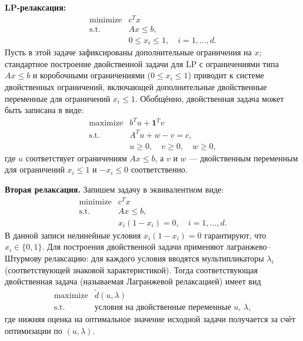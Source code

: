 \documentclass[a4paper,12pt]{article}
\begin{document}
	\textbf{LP-релаксация:}
	\[
	\begin{array}{rl}
		\text{minimize} & c^T x\\[1mm]
		\text{s.t.} & Ax \le b,\\[1mm]
		& 0 \le x_i \le 1,\quad i=1,\dots,d.
	\end{array}
	\]
	Пусть в этой задаче зафиксированы дополнительные ограничения на $x$; стандартное построение двойственной задачи для LP с ограничениями типа $Ax\le b$ и коробочными ограничениями ($0\le x_i\le 1$) приводит к системе двойственных ограничений, включающей дополнительные двойственные переменные для ограничений $x_i\le1$. Обобщённо, двойственная задача может быть записана в виде:
	\[
	\begin{array}{rl}
		\text{maximize} & b^T u + \mathbf{1}^T v\\[1mm]
		\text{s.t.} & A^T u + w - v = c,\\[1mm]
		& u\ge 0,\quad v\ge 0,\quad w\ge 0,
	\end{array}
	\]
	где $u$ соответствует ограничениям $Ax\le b$, а $v$ и $w$ --- двойственным переменным для ограничений $x_i\le 1$ и $-x_i\le 0$ соответственно.
	
	\medskip
	
	\textbf{Вторая релаксация.}  
	Запишем задачу в эквивалентном виде:
	\[
	\begin{array}{rl}
		\text{minimize} & c^T x\\[1mm]
		\text{s.t.} & Ax \le b,\\[1mm]
		& x_i(1-x_i)=0,\quad i=1,\dots,d.
	\end{array}
	\]
	В данной записи нелинейные условия $x_i(1-x_i)=0$ гарантируют, что $x_i\in\{0,1\}$. Для построения двойственной задачи применяют лагранжево–Штурмову релаксацию: для каждого условия вводятся мультипликаторы $\lambda_i$ (соответствующей знаковой характеристикой). Тогда соответствующая двойственная задача (называемая Лагранжевой релаксацией) имеет вид
	\[
	\begin{array}{rl}
		\text{maximize} & \tilde{d}(u,\lambda)\\[2mm]
		\text{s.t.} & \text{условия на двойственные переменные } u,\, \lambda,
	\end{array}
	\]
	где нижняя оценка на оптимальное значение исходной задачи получается за счёт оптимизации по $(u,\lambda)$.
	

	
	\bigskip
	
\end{document}
